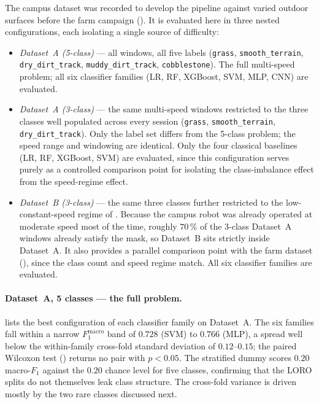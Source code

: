 The campus dataset was recorded to develop the pipeline against varied outdoor surfaces before the farm campaign (). It is evaluated here in three nested configurations, each isolating a single source of difficulty:
\begin{itemize}
    \item \emph{Dataset~A (5-class)} --- all windows, all five labels (\texttt{grass}, \texttt{smooth\_terrain}, \texttt{dry\_dirt\allowbreak \_track}, \texttt{muddy\_dirt\_track}, \texttt{cobblestone}). The full multi-speed problem; all six classifier families (LR, RF, XGBoost, SVM, MLP, CNN) are evaluated.
    \item \emph{Dataset~A (3-class)} --- the same multi-speed windows restricted to the three classes well populated across every session (\texttt{grass}, \texttt{smooth\_terrain}, \texttt{dry\_\allowbreak dirt\_track}). Only the label set differs from the 5-class problem; the speed range and windowing are identical. Only the four classical baselines (LR, RF, XGBoost, SVM) are evaluated, since this configuration serves purely as a controlled comparison point for isolating the class-imbalance effect from the speed-regime effect.
    \item \emph{Dataset~B (3-class)} --- the same three classes further restricted to the low-constant-speed regime of . Because the campus robot was already operated at moderate speed most of the time, roughly $70\,\%$ of the 3-class Dataset~A windows already satisfy the mask, so Dataset~B sits strictly inside Dataset~A. It also provides a parallel comparison point with the farm dataset (), since the class count and speed regime match. All six classifier families are evaluated.
\end{itemize}

\paragraph{Dataset~A, 5 classes --- the full problem.}  lists the best configuration of each classifier family on Dataset~A. The six families fall within a narrow $F_1^{\mathrm{macro}}$ band of $0.728$ (SVM) to $0.766$ (MLP), a spread well below the within-family cross-fold standard deviation of $0.12$--$0.15$; the paired Wilcoxon test () returns no pair with $p < 0.05$. The stratified dummy scores $0.20$ macro-$F_1$ against the $0.20$ chance level for five classes, confirming that the LORO splits do not themselves leak class structure. The cross-fold variance is driven mostly by the two rare classes discussed next.

